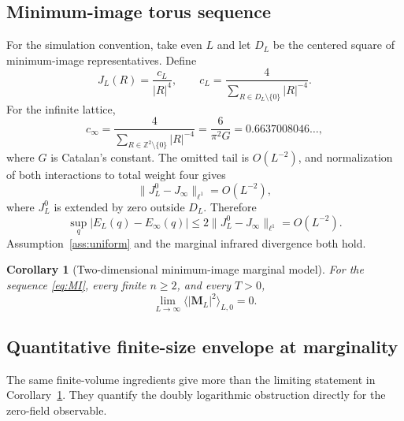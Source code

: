 \documentclass[aps,prb,twocolumn,groupedaddress,amsmath,amssymb,
               superscriptaddress,nofootinbib,floatfix]{revtex4-2}
\theoremstyle{plain}
\newtheorem{corollary}{Corollary}
\theoremstyle{definition}
\newcommand{\cL}{c_L}
\newcommand{\cinf}{c_\infty}
\begin{document}
\subsection{Minimum-image torus sequence}

For the simulation convention, take even $L$ and let $D_L$ be the centered
square of minimum-image representatives.  Define
\begin{equation}
 J_L(R)=\frac{\cL}{|R|^4},\qquad
 \cL=\frac4{\displaystyle
 \sum_{R\in D_L\setminus\{0\}}|R|^{-4}}.               \label{eq:MI}
\end{equation}
For the infinite lattice,
\begin{equation}
 \cinf=
 \frac4{\displaystyle
 \sum_{R\in\mathbb Z^2\setminus\{0\}}|R|^{-4}}
 =
 \frac6{\pi^2G}
 =
 0.6637008046\ldots,                                   \label{eq:c-infinity}
\end{equation}
where $G$ is Catalan's constant.  The omitted tail is $O(L^{-2})$, and
normalization of both interactions to total weight four gives
\begin{equation}
 \|J_L^0-J_\infty\|_{\ell^1}=O(L^{-2}),                \label{eq:l1}
\end{equation}
where $J_L^0$ is extended by zero outside $D_L$.  Therefore
\begin{equation}
 \sup_q|E_L(q)-E_\infty(q)|
 \le2\|J_L^0-J_\infty\|_{\ell^1}
 =O(L^{-2}).                                           \label{eq:uniform-MI}
\end{equation}
Assumption~\ref{ass:uniform} and the marginal infrared divergence both hold.

\begin{corollary}[Two-dimensional minimum-image marginal model]
\label{cor:MI}
For the sequence \eqref{eq:MI}, every finite $n\ge2$, and every $T>0$,
\begin{equation}
 \lim_{L\to\infty}
 \langle|\bm M_L|^2\rangle_{L,0}=0.                   \label{eq:MI-result}
\end{equation}
\end{corollary}

\subsection{Quantitative finite-size envelope at marginality}

The same finite-volume ingredients give more than the limiting statement in
Corollary~\ref{cor:MI}.  They quantify the doubly logarithmic obstruction
directly for the zero-field observable.
\end{document}

